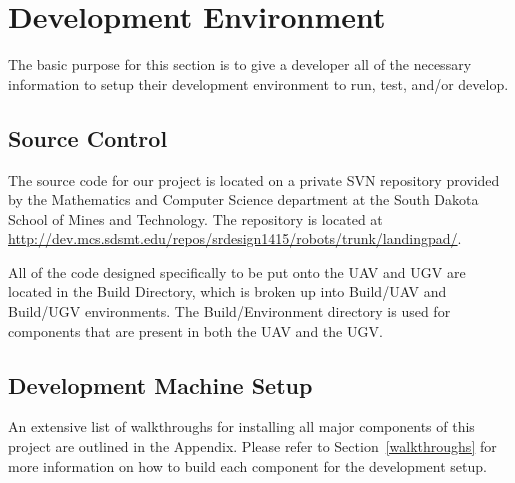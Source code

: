 \chapter{Development Environment}
The basic purpose for this section is to give a developer all of the necessary 
information to setup their development environment to run, test, and/or develop. 



\section{Source  Control}

The source code for our project is located on a private SVN repository provided by the Mathematics and Computer Science department at the South Dakota School of Mines and Technology. The repository is located at \url{http://dev.mcs.sdsmt.edu/repos/srdesign1415/robots/trunk/landingpad/}.

All of the code designed specifically to be put onto the UAV and UGV are located in the Build Directory, which is broken up into Build/UAV and Build/UGV environments. The Build/Environment directory is used for components that are present in both the UAV and the UGV.

%

\section{Development Machine Setup}
An extensive list of walkthroughs for installing all major components of this project are outlined in the Appendix. Please refer to Section~\ref{walkthroughs} for more information on how to build each component for the development setup.
